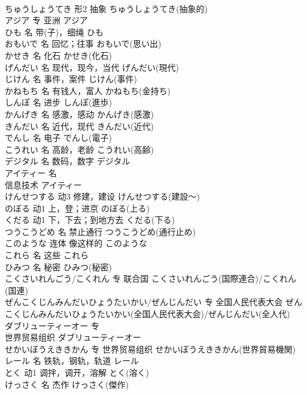 \documentclass[8pt]{extreport}
\begin{document}
\begin{CJK}{UTF8}{min}
\\	ちゅうしょうてき	形2	抽象	ちゅうしょうてき(抽象的)	
\\	アジア	专	亚洲	アジア	
\\	ひも	名	带(子)，细绳	ひも	
\\	おもいで	名	回忆；往事	おもいで(思い出)	
\\	かせき	名	化石	かせき(化石)	
\\	げんだい	名	现代，现今，当代	げんだい(現代)	
\\	じけん	名	事件，案件	じけん(事件)	
\\	かねもち	名	有钱人，富人	かねもち(金持ち)	
\\	しんぽ	名	进步	しんぽ(進歩)	
\\	かんげき	名	感激，感动	かんげき(感激)	
\\	きんだい	名	近代，现代	きんだい(近代)	
\\	でんし	名	电子	でんし(電子)	
\\	こうれい	名	高龄，老龄	こうれい(高齢)	
\\	デジタル	名	数码，数字	デジタル	
\\	アイティー	名	
\\	信息技术	アイティー
\\	けんせつする	动3	修建，建设	けんせつする(建設～)	
\\	のぼる	动1	上，登；进京	のぼる(上る)	
\\	くだる	动1	下，下去；到地方去	くだる(下る)	
\\	つうこうどめ	名	禁止通行	つうこうどめ(通行止め)	
\\	このような	连体	像这样的	このような	
\\	これら	名	这些	これら	
\\	ひみつ	名	秘密	ひみつ(秘密)	
\\	こくさいれんごう/こくれん	专	联合国	こくさいれんごう(国際連合)/こくれん(国連)	
\\	ぜんこくじんみんだいひょうたいかい/ぜんじんだい	专	全国人民代表大会	ぜんこくじんみんだいひょうたいかい(全国人民代表大会)/ぜんじんだい(全人代)	
\\	ダブリューティーオー	专	
\\	世界贸易组织	ダブリューティーオー
\\	せかいぼうえききかん	专	世界贸易组织	せかいぼうえききかん(世界貿易機関)	
\\	レール	名	铁轨，钢轨，轨道	レール	
\\	とく	动1	调拌，调开，溶解	とく(溶く)	
\\	けっさく	名	杰作	けっさく(傑作)	

\end{CJK}
\end{document}
